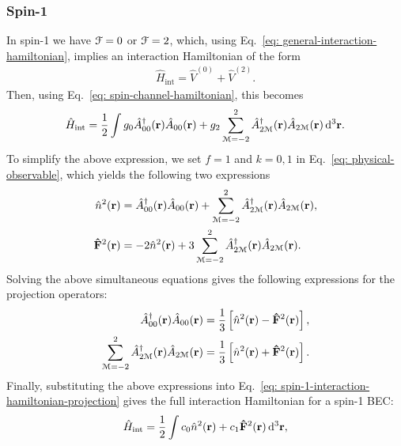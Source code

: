 \subsubsection{Spin-1}
In spin-1 we have \(\EuScript{F} = 0\) or \(\EuScript{F} = 2\), which, using
Eq.~\eqref{eq: general-interaction-hamiltonian}, implies an interaction
Hamiltonian of the form
\begin{align}
    \hat{H}_\text{int} = \hat{V}^{(0)} + \hat{V}^{(2)}.
\end{align}
Then, using Eq.~\eqref{eq: spin-channel-hamiltonian}, this becomes
\begin{align}\label{eq: spin-1-interaction-hamiltonian-projection}
    \hat{H}_\text{int} = \frac{1}{2}\int
        g_0\hat{A}^\dagger_{00}(\vb{r})\hat{A}_{00}(\vb{r})
        + g_2\sum_{\EuScript{M}=-2}^{2}
        \hat{A}^\dagger_{2\EuScript{M}}(\vb{r})\hat{A}_{2\EuScript{M}}(\vb{r})
        \, \dd^3\vb{r}.
\end{align}
To simplify the above expression, we set \(f=1\) and \(k=0, 1\) in
Eq.~\eqref{eq: physical-observable}, which yields the following two expressions
\begin{align}
    \hat{n}^2(\vb{r}) &= \hat{A}^\dagger_{00}(\vb{r})\hat{A}_{00}(\vb{r})
    + \sum_{\EuScript{M}=-2}^{2}
    \hat{A}^\dagger_{2\EuScript{M}}(\vb{r})\hat{A}_{2\EuScript{M}}(\vb{r}), \\
    \vb{\hat{F}}^2(\vb{r}) &= -2\hat{n}^2(\vb{r}) + 3 \sum_{\EuScript{M}=-2}^{2}
    \hat{A}^\dagger_{2\EuScript{M}}(\vb{r})\hat{A}_{2\EuScript{M}}(\vb{r}).
\end{align}
Solving the above simultaneous equations gives the following expressions for
the projection operators:
\begin{align}
    \hat{A}^\dagger_{00}(\vb{r})\hat{A}_{00}(\vb{r}) &=
        \frac{1}{3}\left[\hat{n}^2(\vb{r}) - \vb{\hat{F}}^2(\vb{r})\right], \\
    \sum_{\EuScript{M}=-2}^{2}
    \hat{A}^\dagger_{2\EuScript{M}}(\vb{r})\hat{A}_{2\EuScript{M}}(\vb{r}) &=
    \frac{1}{3}\left[\hat{n}^2(\vb{r}) + \vb{\hat{F}}^2(\vb{r})\right].
\end{align}
Finally, substituting the above expressions into
Eq.~\eqref{eq: spin-1-interaction-hamiltonian-projection} gives the full
interaction Hamiltonian for a spin-1 BEC\@:
\begin{align}\label{eq: spin-1-interaction-hamiltonian}
    \hat{H}_\text{int} = \frac{1}{2}\int c_0\hat{n}^2(\vb{r})
    + c_1\vb{\hat{F}}^2(\vb{r}) \, \dd^3\vb{r},
\end{align}
